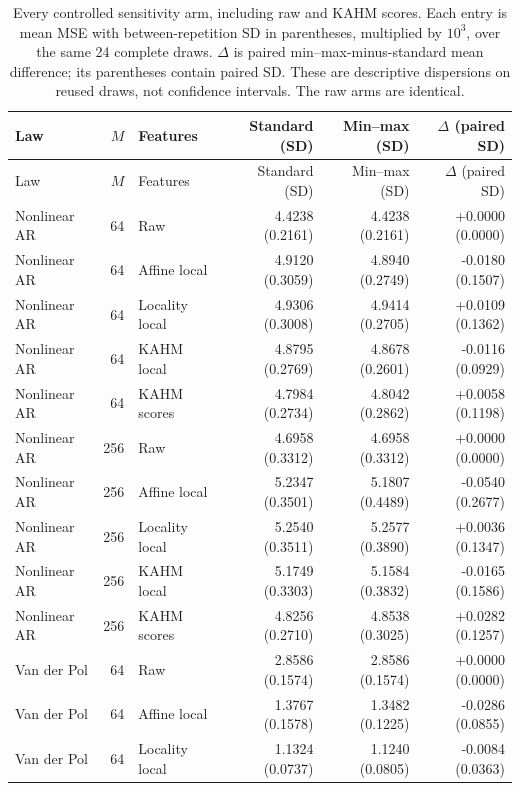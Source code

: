 \begingroup
\scriptsize
\setlength{\tabcolsep}{4pt}
\begin{longtable}{lrlrrr}
\caption{Every controlled sensitivity arm, including raw and KAHM scores. Each entry is mean MSE with between-repetition SD in parentheses, multiplied by $10^3$, over the same 24 complete draws. $\Delta$ is paired min--max-minus-standard mean difference; its parentheses contain paired SD. These are descriptive dispersions on reused draws, not confidence intervals. The raw arms are identical.}\label{tab:scaling-controlled-all}\\
\toprule
Law & $M$ & Features & Standard (SD) & Min--max (SD) & $\Delta$ (paired SD) \\
\midrule
\endfirsthead
\toprule
Law & $M$ & Features & Standard (SD) & Min--max (SD) & $\Delta$ (paired SD) \\
\midrule
\endhead
\bottomrule
\endfoot
Nonlinear AR & 64 & Raw & 4.4238 (0.2161) & 4.4238 (0.2161) & +0.0000 (0.0000) \\
Nonlinear AR & 64 & Affine local & 4.9120 (0.3059) & 4.8940 (0.2749) & -0.0180 (0.1507) \\
Nonlinear AR & 64 & Locality local & 4.9306 (0.3008) & 4.9414 (0.2705) & +0.0109 (0.1362) \\
Nonlinear AR & 64 & KAHM local & 4.8795 (0.2769) & 4.8678 (0.2601) & -0.0116 (0.0929) \\
Nonlinear AR & 64 & KAHM scores & 4.7984 (0.2734) & 4.8042 (0.2862) & +0.0058 (0.1198) \\
\addlinespace
Nonlinear AR & 256 & Raw & 4.6958 (0.3312) & 4.6958 (0.3312) & +0.0000 (0.0000) \\
Nonlinear AR & 256 & Affine local & 5.2347 (0.3501) & 5.1807 (0.4489) & -0.0540 (0.2677) \\
Nonlinear AR & 256 & Locality local & 5.2540 (0.3511) & 5.2577 (0.3890) & +0.0036 (0.1347) \\
Nonlinear AR & 256 & KAHM local & 5.1749 (0.3303) & 5.1584 (0.3832) & -0.0165 (0.1586) \\
Nonlinear AR & 256 & KAHM scores & 4.8256 (0.2710) & 4.8538 (0.3025) & +0.0282 (0.1257) \\
\addlinespace
Van der Pol & 64 & Raw & 2.8586 (0.1574) & 2.8586 (0.1574) & +0.0000 (0.0000) \\
Van der Pol & 64 & Affine local & 1.3767 (0.1578) & 1.3482 (0.1225) & -0.0286 (0.0855) \\
Van der Pol & 64 & Locality local & 1.1324 (0.0737) & 1.1240 (0.0805) & -0.0084 (0.0363) \\

\end{longtable}
